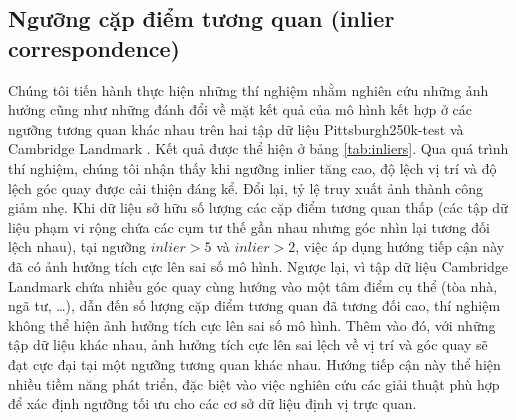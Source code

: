 \subsection{Ngưỡng cặp điểm tương quan (inlier correspondence)}

Chúng tôi tiến hành thực hiện những thí nghiệm nhằm nghiên cứu những ảnh hưởng cũng như những đánh đổi về mặt kết quả của mô hình kết hợp ở các ngưỡng tương quan khác nhau trên hai tập dữ liệu Pittsburgh250k-test \cite{6618963} và Cambridge Landmark \cite{kendall2016posenet}. Kết quả được thể hiện ở bảng \ref{tab:inliers}. Qua quá trình thí nghiệm, chúng tôi nhận thấy khi ngưỡng inlier tăng cao, độ lệch vị trí và độ lệch góc quay được cải thiện đáng kể. Đổi lại, tỷ lệ truy xuất ảnh thành công giảm nhẹ. Khi dữ liệu sở hữu số lượng các cặp điểm tương quan thấp (các tập dữ liệu phạm vi rộng chứa các cụm tư thế gần nhau nhưng góc nhìn lại tương đối lệch nhau), tại ngưỡng $inlier > 5$ và $inlier > 2$, việc áp dụng hướng tiếp cận này đã có ảnh hưởng tích cực lên sai số mô hình. Ngược lại, vì tập dữ liệu Cambridge Landmark chứa nhiều góc quay cùng hướng vào một tâm điểm cụ thể (tòa nhà, ngã tư, \dots), dẫn đến số lượng cặp điểm tương quan đã tương đối cao, thí nghiệm không thể hiện ảnh hưởng tích cực lên sai số mô hình. Thêm vào đó, với những tập dữ liệu khác nhau, ảnh hưởng tích cực lên sai lệch về vị trí và góc quay sẽ đạt cực đại tại một ngưỡng tương quan khác nhau. Hướng tiếp cận này thể hiện nhiều tiềm năng phát triển, đặc biệt vào việc nghiên cứu các giải thuật phù hợp để xác định ngưỡng tối ưu cho các cơ sở dữ liệu định vị trực quan.

